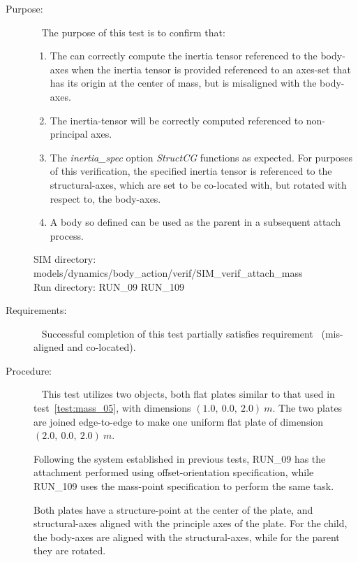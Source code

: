 \label{test:mass_09}
\begin{description}
\item[Purpose:] \ \newline
The purpose of this test is to confirm that:
\begin{enumerate}
 \item  The \ModelDesc
can correctly compute the inertia tensor referenced to the body-axes when the
inertia tensor is provided referenced to an axes-set that
has its origin at the center of mass, but is misaligned with the body-axes.
\item The inertia-tensor will be correctly computed referenced to non-principal
axes.
\item The \textit{inertia\_spec} option \textit{StructCG} functions as
expected.  For purposes of this verification, the specified inertia tensor is
referenced to the structural-axes, which are set to
be co-located with, but rotated with respect
to, the body-axes.
\item A body so defined can be used as the parent in a
subsequent attach process.
\end{enumerate}

SIM directory: models/dynamics/body\_action/verif/SIM\_verif\_attach\_mass\\
Run directory: RUN\_09 RUN\_109


\item[Requirements:] \ \newline
Successful completion of this test partially satisfies
requirement~ (mis-aligned and co-located).


\item[Procedure:]\ \newline
This test utilizes two objects, both flat plates similar to that used in
test~\ref{test:mass_05}, with dimensions $(1.0, ~0.0, ~2.0) ~m$.  The two
plates are joined edge-to-edge to
make one uniform flat plate of dimension $(2.0, ~0.0, ~2.0) ~m$.

Following the system established in previous tests, RUN\_09 has the attachment
performed using offset-orientation specification, while RUN\_109 uses the
mass-point specification to perform the same task.

Both plates have a
structure-point at the center of the plate, and structural-axes aligned with
the principle axes of the plate.  For the child, the body-axes are aligned
with the structural-axes, while for the parent they are rotated.


\end{description}
